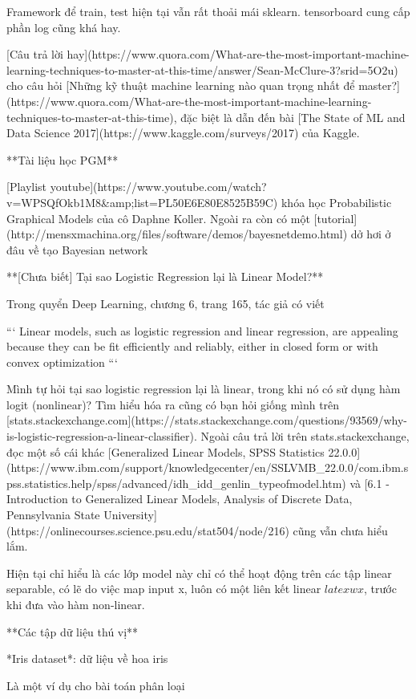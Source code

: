 Framework để train, test hiện tại vẫn rất thoải mái sklearn. tensorboard cung cấp phần log cũng khá hay.

[Câu trả lời hay](https://www.quora.com/What-are-the-most-important-machine-learning-techniques-to-master-at-this-time/answer/Sean-McClure-3?srid=5O2u) cho câu hỏi [Những kỹ thuật machine learning nào quan trọng nhất để master?](https://www.quora.com/What-are-the-most-important-machine-learning-techniques-to-master-at-this-time), đặc biệt là dẫn đến bài [The State of ML and Data Science 2017](https://www.kaggle.com/surveys/2017) của Kaggle.

**Tài liệu học PGM**

[Playlist youtube](https://www.youtube.com/watch?v=WPSQfOkb1M8&amp;list=PL50E6E80E8525B59C) khóa học Probabilistic Graphical Models của cô Daphne Koller. Ngoài ra còn có một [tutorial](http://mensxmachina.org/files/software/demos/bayesnetdemo.html) dở hơi ở đâu về tạo Bayesian network

**[Chưa biết] Tại sao Logistic Regression lại là Linear Model?**

Trong quyển Deep Learning, chương 6, trang 165, tác giả có viết

```
Linear models, such as logistic regression and linear
regression, are appealing because they can be ﬁt
eﬃciently and reliably, either in closed form or
with convex optimization
```

Mình tự hỏi tại sao logistic regression lại là linear, trong khi nó có sử dụng hàm logit (nonlinear)? Tìm hiểu hóa ra cũng có bạn hỏi giống mình trên [stats.stackexchange.com](https://stats.stackexchange.com/questions/93569/why-is-logistic-regression-a-linear-classifier). Ngoài câu trả lời trên stats.stackexchange, đọc một số cái khác [Generalized Linear Models, SPSS Statistics 22.0.0](https://www.ibm.com/support/knowledgecenter/en/SSLVMB_22.0.0/com.ibm.spss.statistics.help/spss/advanced/idh_idd_genlin_typeofmodel.htm)
 và [6.1 - Introduction to Generalized Linear Models, Analysis of Discrete Data, Pennsylvania State University](https://onlinecourses.science.psu.edu/stat504/node/216) cũng vẫn chưa hiểu lắm.

Hiện tại chỉ hiểu là các lớp model này chỉ có thể hoạt động trên các tập linear separable, có lẽ do việc map input x, luôn có một liên kết linear $latex wx$, trước khi đưa vào hàm non-linear.

**Các tập dữ liệu thú vị**

*Iris dataset*: dữ liệu về hoa iris

Là một ví dụ cho bài toán phân loại

